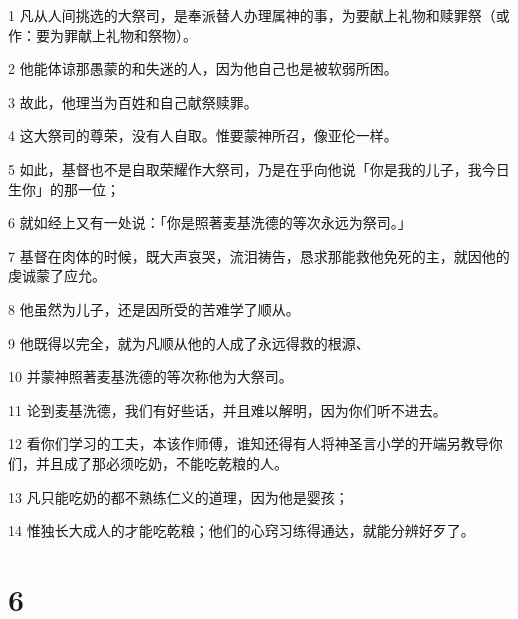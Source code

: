 \par 1 凡从人间挑选的大祭司，是奉派替人办理属神的事，为要献上礼物和赎罪祭（或作：要为罪献上礼物和祭物）。
\par 2 他能体谅那愚蒙的和失迷的人，因为他自己也是被软弱所困。
\par 3 故此，他理当为百姓和自己献祭赎罪。
\par 4 这大祭司的尊荣，没有人自取。惟要蒙神所召，像亚伦一样。
\par 5 如此，基督也不是自取荣耀作大祭司，乃是在乎向他说「你是我的儿子，我今日生你」的那一位；
\par 6 就如经上又有一处说：「你是照著麦基洗德的等次永远为祭司。」
\par 7 基督在肉体的时候，既大声哀哭，流泪祷告，恳求那能救他免死的主，就因他的虔诚蒙了应允。
\par 8 他虽然为儿子，还是因所受的苦难学了顺从。
\par 9 他既得以完全，就为凡顺从他的人成了永远得救的根源、
\par 10 并蒙神照著麦基洗德的等次称他为大祭司。
\par 11 论到麦基洗德，我们有好些话，并且难以解明，因为你们听不进去。
\par 12 看你们学习的工夫，本该作师傅，谁知还得有人将神圣言小学的开端另教导你们，并且成了那必须吃奶，不能吃乾粮的人。
\par 13 凡只能吃奶的都不熟练仁义的道理，因为他是婴孩；
\par 14 惟独长大成人的才能吃乾粮；他们的心窍习练得通达，就能分辨好歹了。

\chapter{6}

